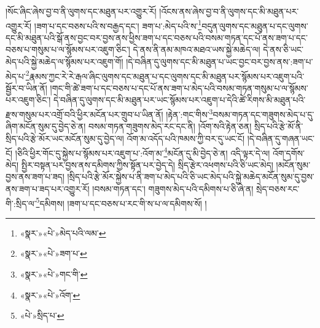 །སོང་ཞིང་ཞེས་བྱ་བ་ནི་ལུགས་དང་མཐུན་པར་འགྱུར་རོ། །འོངས་ནས་ཞེས་བྱ་བ་ནི་ལུགས་དང་མི་མཐུན་པར་འགྱུར་རོ། །ཟག་པ་དང་བཅས་པའི་ས་བརྒྱད་དང་། ཟག་པ་:མེད་པའི་ས་\footnote{«སྣར་»«པེ་»མེད་པའི་ལམ་}བདུན་ལུགས་དང་མཐུན་པ་དང་ལུགས་དང་མི་མཐུན་པའི་སྒོ་ནས་བྱང་བར་བྱས་ནས་ཕྱིས་ཟག་པ་དང་བཅས་པའི་བསམ་གཏན་དང་པོ་ནས་ཟག་པ་དང་བཅས་པ་གསུམ་པ་ལ་སྙོམས་པར་འཇུག་ཅིང་། དེ་ནས་ནི་ནམ་མཁའ་མཐའ་ཡས་སྐྱེ་མཆེད་ལ། དེ་ནས་ཅི་ཡང་མེད་པའི་སྐྱེ་མཆེད་ལ་སྙོམས་པར་འཇུག་གོ། །དེ་བཞིན་དུ་ལུགས་དང་མི་མཐུན་པ་ཡང་བྱང་བར་བྱས་ནས་:ཟག་པ་མེད་པ་\footnote{«སྣར་»«པེ་»ཟག་པ་}རྣམས་ཀྱང་རེ་རེ་རྒལ་ཞིང་ལུགས་དང་མཐུན་པ་དང་ལུགས་དང་མི་མཐུན་པར་སྙོམས་པར་འཇུག་པའི་སྦྱོར་བ་ཡིན་ནོ། །གང་གི་ཚེ་ཟག་པ་དང་བཅས་པ་དང་པོ་ནས་ཟག་པ་མེད་པའི་བསམ་གཏན་གསུམ་པ་ལ་སྙོམས་པར་འཇུག་ཅིང་། དེ་བཞིན་དུ་ལུགས་དང་མི་མཐུན་པར་ཡང་སྙོམས་པར་འཇུག་པ་དེའི་ཚེ་རིགས་མི་མཐུན་པའི་རྫས་གསུམ་པར་འགྲོ་བའི་ཕྱིར་མངོན་པར་གྲུབ་པ་ཡིན་ནོ། །རྟེན་:གང་གིས་\footnote{«སྣར་»«པེ་»གང་གི་}བསམ་གཏན་དང་གཟུགས་མེད་པ་དུ་ཞིག་མངོན་སུམ་དུ་བྱེད་ཅེ་ན། བསམ་གཏན་གཟུགས་མེད་རང་དང་ནི། །འོག་སའི་རྟེན་ཅན། སྲིད་པའི་རྩེ་མོ་ནི་སྲིད་པའི་རྩེ་མོར་ཡང་མངོན་སུམ་དུ་བྱེད་ལ། འོག་མ་འདོད་པའི་ཁམས་ཀྱི་བར་དུ་ཡང་ངོ། །དེ་བཞིན་དུ་གཞན་ཡང་ངོ། །ཅིའི་ཕྱིར་གོང་དུ་སྐྱེས་པ་སྙོམས་པར་འཇུག་པ་:འོག་མ་\footnote{«སྣར་»«པེ་»འོག་}མངོན་དུ་མི་བྱེད་ཅེ་ན། འདི་ལྟར་དེ་ལ། འོག་དགོས་མེད། སྤྱིར་བསྟན་པར་བྱས་ནས་དམིགས་ཀྱིས་སྟོན་པར་བྱེད་དེ། སྲིད་རྩེར་འཕགས་པའི་ཅི་ཡང་མེད། །མངོན་སུམ་བྱས་ནས་ཟག་པ་ཟད། །སྲིད་པའི་རྩེ་མོར་སྐྱེས་པ་ནི་ཟག་པ་མེད་པའི་ཅི་ཡང་མེད་པའི་སྐྱེ་མཆེད་མངོན་སུམ་དུ་བྱས་ནས་ཟག་པ་ཟད་པར་འགྱུར་རོ། །བསམ་གཏན་དང་། གཟུགས་མེད་པའི་དམིགས་པ་ཅི་ཞེ་ན། སྲེད་བཅས་རང་གི་:སྲིད་ལ་\footnote{«པེ་»སྲིད་པ་}དམིགས། །ཟག་པ་དང་བཅས་པ་རང་གི་ས་པ་ལ་དམིགས་སོ། །
